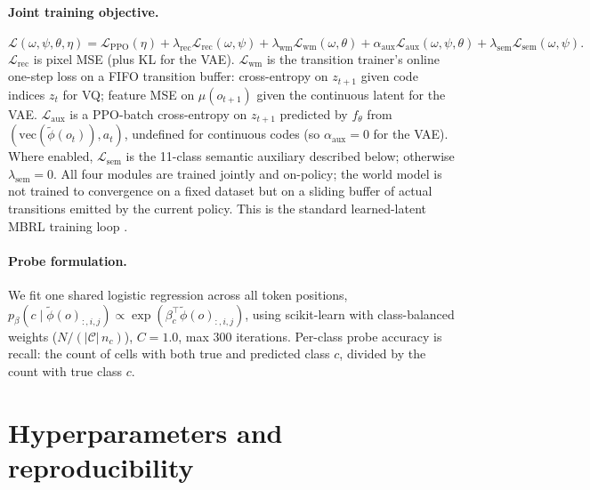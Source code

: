 \documentclass{article}
\begin{document}
\paragraph{Joint training objective.}
\begin{equation}
  \mathcal{L}(\omega, \psi, \theta, \eta) = \mathcal{L}_{\text{PPO}}(\eta) + \lambda_{\text{rec}} \mathcal{L}_{\text{rec}}(\omega, \psi) + \lambda_{\text{wm}} \mathcal{L}_{\text{wm}}(\omega, \theta) + \alpha_{\text{aux}} \mathcal{L}_{\text{aux}}(\omega, \psi, \theta) + \lambda_{\text{sem}} \mathcal{L}_{\text{sem}}(\omega, \psi).
\end{equation}
$\mathcal{L}_{\text{rec}}$ is pixel MSE (plus KL for the VAE). $\mathcal{L}_{\text{wm}}$ is the transition trainer's online one-step loss on a FIFO transition buffer: cross-entropy on $z_{t+1}$ given code indices $z_t$ for VQ; feature MSE on $\mu(o_{t+1})$ given the continuous latent for the VAE. $\mathcal{L}_{\text{aux}}$ is a PPO-batch cross-entropy on $z_{t+1}$ predicted by $f_\theta$ from $(\mathrm{vec}(\tilde\phi(o_t)), a_t)$, undefined for continuous codes (so $\alpha_{\text{aux}}{=}0$ for the VAE). Where enabled, $\mathcal{L}_{\text{sem}}$ is the 11-class semantic auxiliary described below; otherwise $\lambda_{\text{sem}}{=}0$. All four modules are trained jointly and on-policy; the world model is not trained to convergence on a fixed dataset but on a sliding buffer of actual transitions emitted by the current policy. This is the standard learned-latent MBRL training loop \citep{hafner2019dream,micheli2023iris,alonso2024diamond}.

\paragraph{Probe formulation.}
We fit one shared logistic regression across all token positions, $p_\beta(c \mid \tilde\phi(o)_{:,i,j}) \propto \exp(\beta_c^\top \tilde\phi(o)_{:,i,j})$, using scikit-learn with class-balanced weights ($N/(|\mathcal{C}|\, n_c)$), $C{=}1.0$, max 300 iterations. Per-class probe accuracy is recall: the count of cells with both true and predicted class $c$, divided by the count with true class $c$.

\section{Hyperparameters and reproducibility}\label{app:hparams}
\end{document}
